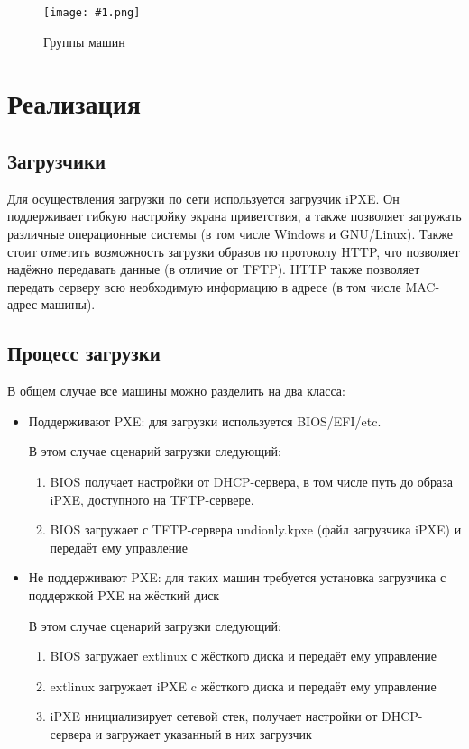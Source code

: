 \documentclass[11pt]{article}
\newcommand{\includepicture}[3]{
\begin{figure}[H]
\begin{center}
\leavevmode
\texttt{[image: \#1.png]}
\end{center}
\caption{#2}
\end{figure}
}
\begin{document}
\vspace{1cm}
\includepicture{groups}{Группы машин}{1}

\section{Реализация}

\subsection{Загрузчики}

Для осуществления загрузки по сети используется загрузчик iPXE.
Он поддерживает гибкую настройку экрана приветствия,
а также позволяет загружать различные операционные системы (в том числе Windows и GNU/Linux).
Также стоит отметить возможность загрузки образов по протоколу HTTP,
что позволяет надёжно передавать данные (в отличие от TFTP).
HTTP также позволяет передать серверу всю необходимую информацию в адресе (в том числе MAC-адрес машины).

\subsection{Процесс загрузки}
В общем случае все машины можно разделить на два класса:
\begin{itemize}
    \item Поддерживают PXE: для загрузки используется BIOS/EFI/etc.

        В этом случае сценарий загрузки следующий:
        \begin{enumerate}
            \item BIOS получает настройки от DHCP-сервера,
                в том числе путь до образа iPXE, доступного на TFTP-сервере.
            \item BIOS загружает с TFTP-сервера undionly.kpxe (файл загрузчика iPXE)
                и передаёт ему управление
        \end{enumerate}

    \item Не поддерживают PXE: для таких машин требуется установка загрузчика
        с поддержкой PXE на жёсткий диск

        В этом случае сценарий загрузки следующий:
        \begin{enumerate}
            \item BIOS загружает extlinux с жёсткого диска и передаёт ему управление
            \item extlinux загружает iPXE c жёсткого диска и передаёт ему управление
            \item iPXE инициализирует сетевой стек,
                получает настройки от DHCP-сервера и загружает указанный в них загрузчик
        \end{enumerate}
\end{itemize}
\end{document}
